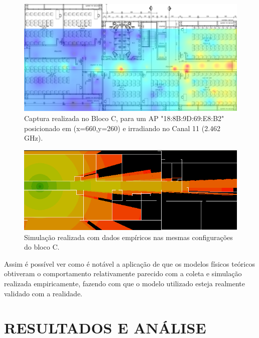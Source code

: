 \documentclass[
	12pt,				%
	twoside,			%
	a4paper,			%
	english,			%
	french,				%
	spanish,			%
	brazil				%
	]{abntex2}
\begin{document}
\begin{figure}[ht]
    \caption{\label{captura} Captura realizada no Bloco C, para um AP "18:8B:9D:69:E8:B2" posicionado em (x=660,y=260) e irradiando no Canal 11 (2.462 GHz).}
    \begin{center}
        \includegraphics[scale=0.5]{imagens/captura.jpg}
    \end{center}
\end{figure}
\begin{figure}[ht]
    \caption{\label{simulacao_vinicius} Simulação realizada com dados empíricos nas mesmas configurações do bloco C. }
    \begin{center}
        \includegraphics[scale=0.7]{imagens/simulacao_vinicius.png}
    \end{center}
\end{figure}

Assim é possível ver como é notável a aplicação de que os modelos
físicos teóricos obtiveram o comportamento relativamente parecido com a
coleta e simulação realizada empiricamente, fazendo com que o modelo
utilizado esteja realmente validado com a realidade.

\chapter{RESULTADOS E ANÁLISE}\label{resultados-e-anuxe1lise}
\end{document}
